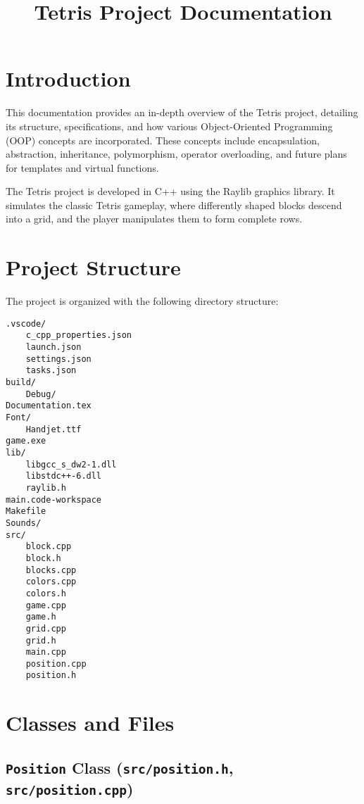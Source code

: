 \documentclass{article}
\begin{document}
\title{Tetris Project Documentation}
\author{}
\date{}
\maketitle

\tableofcontents %
\newpage

\section{Introduction}

This documentation provides an in-depth overview of the Tetris project, detailing its structure, specifications, and how various Object-Oriented Programming (OOP) concepts are incorporated. These concepts include encapsulation, abstraction, inheritance, polymorphism, operator overloading, and future plans for templates and virtual functions.

The Tetris project is developed in C++ using the Raylib graphics library. It simulates the classic Tetris gameplay, where differently shaped blocks descend into a grid, and the player manipulates them to form complete rows.

\section{Project Structure}

The project is organized with the following directory structure:

\begin{verbatim}
.vscode/
    c_cpp_properties.json
    launch.json
    settings.json
    tasks.json
build/
    Debug/
Documentation.tex
Font/
    Handjet.ttf
game.exe
lib/
    libgcc_s_dw2-1.dll
    libstdc++-6.dll
    raylib.h
main.code-workspace
Makefile
Sounds/
src/
    block.cpp
    block.h
    blocks.cpp
    colors.cpp
    colors.h
    game.cpp
    game.h
    grid.cpp
    grid.h
    main.cpp
    position.cpp
    position.h
\end{verbatim}

\section{Classes and Files}

\subsection{\texttt{Position} Class (\texttt{src/position.h}, \texttt{src/position.cpp})}
\end{document}
